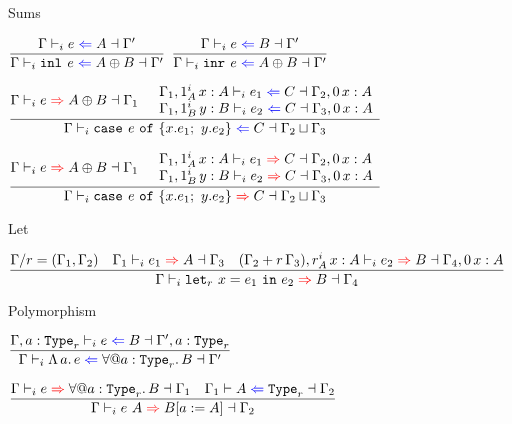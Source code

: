 \begin{frame}{Sums}

\begin{center}
  $\infrule{\checktype{\Gamma}{e}{A}{\Gamma'}}{\checktype{\Gamma}{\inl{e}}{\Sum{A}{B}}{\Gamma'}}$ \quad
  $\infrule{\checktype{\Gamma}{e}{B}{\Gamma'}}{\checktype{\Gamma}{\inr{e}}{\Sum{A}{B}}{\Gamma'}}$

  \vspace{2em}

  $\infrule{\infertype{\Gamma}{e}{\Sum{A}{B}}{\Gamma_1} \quad \begin{array}{l} \checktype{\extend{\Gamma_1}[\totalqty{\One}{A}]{x}{A}}{e_1}{C}{\extend{\Gamma_2}[\Zero]{x}{A}} \\ \checktype{\extend{\Gamma_1}[\totalqty{\One}{B}]{y}{B}}{e_2}{C}{\extend{\Gamma_3}[\Zero]{x}{A}} \end{array}}{\checktype{\Gamma}{\newcase{e}{x}{e_1}{y}{e_2}}{C}{\lubctx{\Gamma_2}{\Gamma_3}}}$

  \vspace{2em}

  $\infrule{\infertype{\Gamma}{e}{\Sum{A}{B}}{\Gamma_1} \quad \begin{array}{l} \infertype{\extend{\Gamma_1}[\totalqty{\One}{A}]{x}{A}}{e_1}{C}{\extend{\Gamma_2}[\Zero]{x}{A}} \\ \infertype{\extend{\Gamma_1}[\totalqty{\One}{B}]{y}{B}}{e_2}{C}{\extend{\Gamma_3}[\Zero]{x}{A}} \end{array}}{\infertype{\Gamma}{\newcase{e}{x}{e_1}{y}{e_2}}{C}{\lubctx{\Gamma_2}{\Gamma_3}}}$
\end{center}

\end{frame}

\begin{frame}{Let}

\begin{center}
  $\infrule{\divctx{\Gamma}{r} = (\Gamma_1, \Gamma_2) \quad \infertype{\Gamma_1}{e_1}{A}{\Gamma_3} \quad \infertype{\extend{(\addctx{\Gamma_2}{\scalectx{r}{\Gamma_3}})}[\totalqty{r}{A}]{x}{A}}{e_2}{B}{\extend{\Gamma_4}[\Zero]{x}{A}}}{\infertype{\Gamma}{\letin[r]{x}{e_1}{e_2}}{B}{\Gamma_4}}$
\end{center}

\end{frame}

\begin{frame}{Polymorphism}

\begin{center}
  $\infrule{\checktype{\extendtype{\Gamma}{a}[r]}{e}{B}{\extendtype{\Gamma'}{a}[r]}}{\checktype{\Gamma}{\tfun{a}{e}}{\ForallE{a}[r]{B}}{\Gamma'}}$

  \vspace{2em}

  $\infrule{\infertype{\Gamma}{e}{\ForallE{a}[r]{B}}{\Gamma_1} \quad \checkkind{\Gamma_1}{A}[r]{\Gamma_2}}{\infertype{\Gamma}{\tapp{e}{A}}{\subst{B}{a}{A}}{\Gamma_2}}$
\end{center}

\end{frame}

